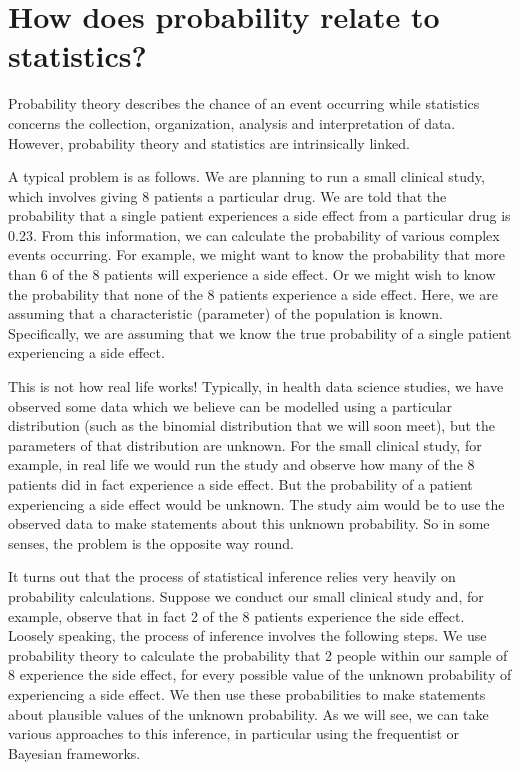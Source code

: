\documentclass[letterpaper,10pt,english]{jupyterBook}
\let\sphinxpxdimen\pdfpxdimen\else\newdimen\sphinxpxdimen
\begin{document}
\section{How does probability relate to statistics?}
\label{\detokenize{02. Probability.Intro:how-does-probability-relate-to-statistics}}
\sphinxAtStartPar
Probability theory describes the chance of an event occurring while statistics concerns the collection, organization, analysis and interpretation of data. However, probability theory and statistics are intrinsically linked.

\sphinxAtStartPar
A typical  problem is as follows. We are planning to run a small clinical study, which involves giving 8 patients a particular drug. We are told that the probability that a single patient experiences a side effect from a particular drug is 0.23. From this information, we can calculate the probability of various complex events occurring. For example, we might want to know the probability that more than 6 of the 8 patients will experience a side effect. Or we might wish to know the probability that none of the 8 patients experience a side effect. Here, we are assuming that a characteristic (parameter) of the population is known. Specifically, we are assuming that we know the true probability of a single patient experiencing a side effect.

\begin{figure}[htbp]
\centering

\noindent\sphinxincludegraphics[height=300\sphinxpxdimen]{{Probability_vs_inference}.png}
\end{figure}

\sphinxAtStartPar
This is not how real life works! Typically, in health data science studies, we have observed some data which we believe can be modelled using a particular distribution (such as the binomial distribution that we will soon meet), but the parameters of that distribution are unknown. For the small clinical study, for example, in real life we would run the study and observe how many of the 8 patients did in fact experience a side effect. But the probability of a patient experiencing a side effect would be unknown. The study aim would be to use the observed data to make statements \sphinxhyphen{}  \sphinxhyphen{} about this unknown probability. So in some senses, the problem is the opposite way round.

\sphinxAtStartPar
It turns out that the process of statistical inference relies very heavily on probability calculations. Suppose we conduct our small clinical study and, for example, observe that in fact 2 of the 8 patients experience the side effect. Loosely speaking, the process of inference involves the following steps. We use probability theory to calculate the probability that 2 people within our sample of 8 experience the side effect, for every possible value of the unknown probability of experiencing a side effect. We then use these probabilities to make statements about plausible values of the unknown probability. As we will see, we can take various approaches to this inference, in particular using the frequentist or Bayesian frameworks.
\end{document}
